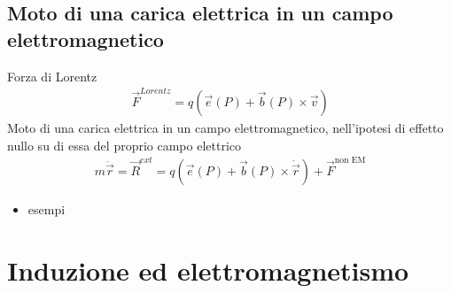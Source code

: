 \documentclass[letterpaper,10pt,italian]{jupyterBook}
\begin{document}
\subsection{Moto di una carica elettrica in un campo elettromagnetico}
\label{\detokenize{ch/electromagnetism/electromagnetism-steady:moto-di-una-carica-elettrica-in-un-campo-elettromagnetico}}
\sphinxAtStartPar
Forza di Lorentz
\begin{equation*}
\begin{split}\vec{F}^{Lorentz} = q \left(\vec{e}(P) + \vec{b}(P) \times \vec{v} \right)\end{split}
\end{equation*}
\sphinxAtStartPar
Moto di una carica elettrica in un campo elettromagnetico, nell’ipotesi di effetto nullo su di essa del proprio campo elettrico
\begin{equation*}
\begin{split}m \ddot{ \vec{r} } = \vec{R}^{ext} = q \left( \vec{e}(P) + \vec{b}(P) \times \dot{\vec{r}} \right) + \vec{F}^{\text{non EM}}\end{split}
\end{equation*}\begin{itemize}
\item {} 
\sphinxAtStartPar
{} esempi

\end{itemize}

\sphinxstepscope


\section{Induzione ed elettromagnetismo}
\label{\detokenize{ch/electromagnetism/electromagnetism-general:induzione-ed-elettromagnetismo}}\label{\detokenize{ch/electromagnetism/electromagnetism-general:physics-hs-electromagnetism-electromagnetism-general}}\label{\detokenize{ch/electromagnetism/electromagnetism-general::doc}}
\end{document}
